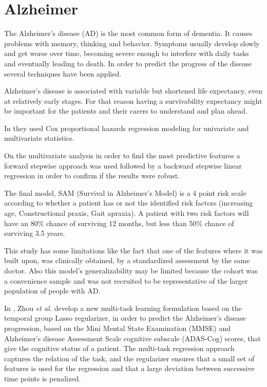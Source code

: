  \section{Alzheimer}
 \label{section:alz}
 
 
The Alzheimer’s disease (AD) is the most common form of dementia. It causes problems with memory, thinking and behavior. 
Symptoms usually develop slowly and get worse over time, becoming severe enough to interfere with daily tasks and eventually 
leading to death. In order to predict the progress of the disease several techniques have been applied.

Alzheimer’s disease is associated with variable but shortened life expectancy, even at relatively early stages. For that
 reason having a survivability expectancy might be important for the patients and their carers to understand and plan ahead. 

In \cite{Paradise2009} they used Cox proportional hazards regression modeling for univariate and multivariate statistics. 

On the multivariate analysis in order to find the most predictive features a forward stepwise approach was used followed
 by a backward stepwise linear regression in order to confirm if the results were robust. 

The final model, SAM (Survival in Alzheimer’s Model) is a 4 point risk scale according to whether a patient has or not the
 identified risk factors (increasing age, Constructional praxis, Gait apraxia). A patient with two risk factors will have 
 an 80\% chance of surviving 12 months, but less than 50\% chance of surviving 3.5 years.

This study has some limitations like the fact that one of the features where it was built upon, was clinically obtained, by a
 standardized assessment by the same doctor. Also this model’s generalizability may be limited because the cohort was a convenience
 sample and was not recruited to be representative of the larger population of people with AD.

In \cite{Zhou2011}, Zhou \emph{et al.} develop a new multi-task learning formulation based on the temporal group Lasso regularizer,
 in order to predict the Alzheimer’s disease progression, based on the Mini Mental State Examination (MMSE) and Alzheimer’s disease 
 Assessment Scale cognitive subscale (ADAS-Cog) scores, that give the cognitive status of a patient. The multi-task regression
 approach captures the relation of the task, and the regularizer ensures that a small set of features is used for the regression
 and that a large deviation between successive time points is penalized.

